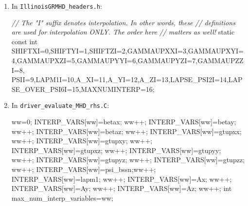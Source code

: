 \documentclass[landscape,letterpaper,10pt,english]{article}
\newenvironment{Shaded}{}{}
\newcommand{\DataTypeTok}[1]{\textcolor[rgb]{0.56,0.13,0.00}{{#1}}}
\newcommand{\DecValTok}[1]{\textcolor[rgb]{0.25,0.63,0.44}{{#1}}}
\newcommand{\CommentTok}[1]{\textcolor[rgb]{0.38,0.63,0.69}{\textit{{#1}}}}
\newcommand{\NormalTok}[1]{{#1}}
\begin{document}
\begin{enumerate}
\def\labelenumi{\arabic{enumi}.}
\item
  In \texttt{IllinoisGRMHD\_headers.h}:

\begin{Shaded}
\begin{Highlighting}[]
\CommentTok{// The "I" suffix denotes interpolation. In other words, these}
\CommentTok{//    definitions are used for interpolation ONLY. The order here}
\CommentTok{//    matters as well!}
\DataTypeTok{static} \DataTypeTok{const} \DataTypeTok{int}\NormalTok{ SHIFTXI=}\DecValTok{0}\NormalTok{,SHIFTYI=}\DecValTok{1}\NormalTok{,SHIFTZI=}\DecValTok{2}\NormalTok{,GAMMAUPXXI=}\DecValTok{3}\NormalTok{,GAMMAUPXYI=}\DecValTok{4}\NormalTok{,GAMMAUPXZI=}\DecValTok{5}\NormalTok{,GAMMAUPYYI=}\DecValTok{6}\NormalTok{,GAMMAUPYZI=}\DecValTok{7}\NormalTok{,GAMMAUPZZI=}\DecValTok{8}\NormalTok{,}
\NormalTok{  PSII=}\DecValTok{9}\NormalTok{,LAPM1I=}\DecValTok{10}\NormalTok{,A_XI=}\DecValTok{11}\NormalTok{,A_YI=}\DecValTok{12}\NormalTok{,A_ZI=}\DecValTok{13}\NormalTok{,LAPSE_PSI2I=}\DecValTok{14}\NormalTok{,LAPSE_OVER_PSI6I=}\DecValTok{15}\NormalTok{,MAXNUMINTERP=}\DecValTok{16}\NormalTok{;}
\end{Highlighting}
\end{Shaded}
\item
  In \texttt{driver\_evaluate\_MHD\_rhs.C}:

\begin{Shaded}
\begin{Highlighting}[]
\NormalTok{  ww=}\DecValTok{0}\NormalTok{;}
\NormalTok{  INTERP_VARS[ww]=betax;   ww++;}
\NormalTok{  INTERP_VARS[ww]=betay;   ww++;}
\NormalTok{  INTERP_VARS[ww]=betaz;   ww++;}
\NormalTok{  INTERP_VARS[ww]=gtupxx;  ww++;}
\NormalTok{  INTERP_VARS[ww]=gtupxy;  ww++;}
\NormalTok{  INTERP_VARS[ww]=gtupxz;  ww++;}
\NormalTok{  INTERP_VARS[ww]=gtupyy;  ww++;}
\NormalTok{  INTERP_VARS[ww]=gtupyz;  ww++;}
\NormalTok{  INTERP_VARS[ww]=gtupzz;  ww++;}
\NormalTok{  INTERP_VARS[ww]=psi_bssn;ww++;}
\NormalTok{  INTERP_VARS[ww]=lapm1;   ww++;}
\NormalTok{  INTERP_VARS[ww]=Ax;      ww++;}
\NormalTok{  INTERP_VARS[ww]=Ay;      ww++;}
\NormalTok{  INTERP_VARS[ww]=Az;      ww++;}
  \DataTypeTok{int}\NormalTok{ max_num_interp_variables=ww;}
\end{Highlighting}
\end{Shaded}
\end{enumerate}
\end{document}
